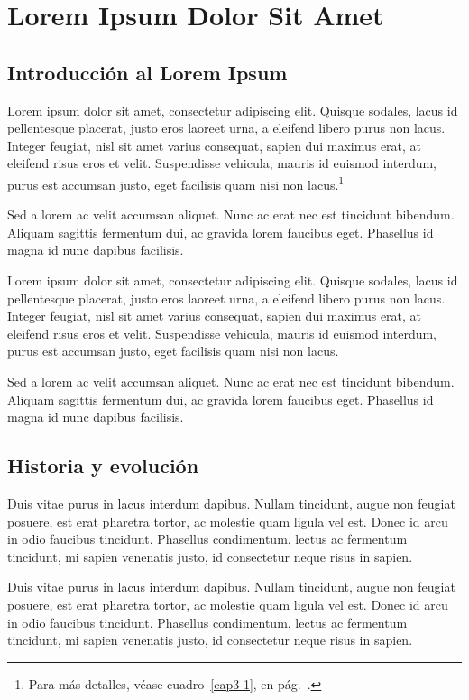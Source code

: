 \chapter{Lorem Ipsum Dolor Sit Amet}
\setcounter{PrimPag}{\theCurrentPage}

\section{Introducción al Lorem Ipsum}

Lorem ipsum dolor sit amet, consectetur adipiscing elit. Quisque sodales, lacus id pellentesque placerat, justo eros laoreet urna, a eleifend libero purus non lacus. Integer feugiat, nisl sit amet varius consequat, sapien dui maximus erat, at eleifend risus eros et velit. Suspendisse vehicula, mauris id euismod interdum, purus est accumsan justo, eget facilisis quam nisi non lacus.\footnote{Para más detalles, véase cuadro~\ref{cap3-1}, en pág.~\pageref{cap3-1}.}

Sed a lorem ac velit accumsan aliquet. Nunc ac erat nec est tincidunt bibendum. Aliquam sagittis fermentum dui, ac gravida lorem faucibus eget. Phasellus id magna id nunc dapibus facilisis.

Lorem ipsum dolor sit amet, consectetur adipiscing elit. Quisque sodales, lacus id pellentesque placerat, justo eros laoreet urna, a eleifend libero purus non lacus. Integer feugiat, nisl sit amet varius consequat, sapien dui maximus erat, at eleifend risus eros et velit. Suspendisse vehicula, mauris id euismod interdum, purus est accumsan justo, eget facilisis quam nisi non lacus.

Sed a lorem ac velit accumsan aliquet. Nunc ac erat nec est tincidunt bibendum. Aliquam sagittis fermentum dui, ac gravida lorem faucibus eget. Phasellus id magna id nunc dapibus facilisis.

\section{Historia y evolución}

Duis vitae purus in lacus interdum dapibus. Nullam tincidunt, augue non feugiat posuere, est erat pharetra tortor, ac molestie quam ligula vel est. Donec id arcu in odio faucibus tincidunt. Phasellus condimentum, lectus ac fermentum tincidunt, mi sapien venenatis justo, id consectetur neque risus in sapien.

Duis vitae purus in lacus interdum dapibus. Nullam tincidunt, augue non feugiat posuere, est erat pharetra tortor, ac molestie quam ligula vel est. Donec id arcu in odio faucibus tincidunt. Phasellus condimentum, lectus ac fermentum tincidunt, mi sapien venenatis justo, id consectetur neque risus in sapien.

